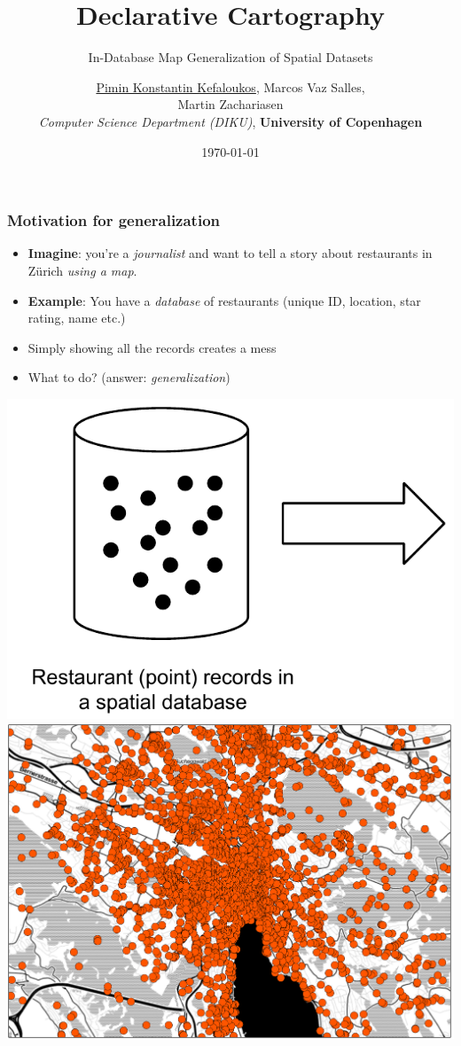 \documentclass{beamer}
\title{Declarative Cartography}
\subtitle{In-Database Map Generalization of Spatial Datasets}
\author{\underline{Pimin Konstantin Kefaloukos}, Marcos Vaz Salles, \\Martin Zachariasen\\ \small{\emph{Computer Science Department (DIKU)}, \textbf{University of Copenhagen}}}
\date{\today}
\begin{document}
\frame{\titlepage}

\frame
{
  \frametitle{Motivation for generalization}
  \begin{itemize}
  \item \textbf{Imagine}: you're a \emph{journalist} and want to tell a story about restaurants in Z\"{u}rich \emph{using a map}.
  \item \textbf{Example}: You have a \emph{database} of restaurants (unique ID, location, star rating, name etc.)
  \item Simply showing all the records creates a mess
  \item What to do? (answer: \emph{generalization})
  \end{itemize}
  \includegraphics[scale=0.5]{figs/spatial-database-with-points.pdf} \includegraphics[scale=0.18]{figs/zurich-unfiltered.pdf}
}
\end{document}
